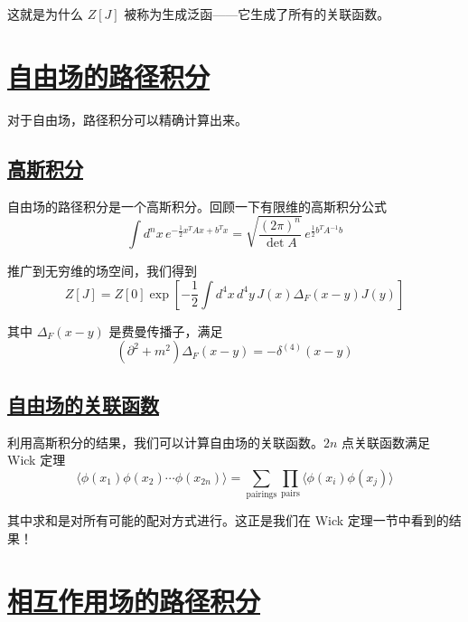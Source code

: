 这就是为什么 $Z[J]$ 被称为生成泛函——它生成了所有的关联函数。

\section{\protect\hyperlink{:}{自由场的路径积分}}

对于自由场，路径积分可以精确计算出来。

\subsection{\protect\hyperlink{:}{高斯积分}}

自由场的路径积分是一个高斯积分。回顾一下有限维的高斯积分公式
\begin{equation}
    \int d^n x \, e^{-\frac{1}{2}x^T A x + b^T x} = \sqrt{\frac{(2\pi)^n}{\det A}} \, e^{\frac{1}{2}b^T A^{-1} b}
\end{equation}

推广到无穷维的场空间，我们得到
\begin{equation}
    Z[J] = Z[0] \exp\left[-\frac{1}{2}\int d^4x \, d^4y \, J(x) \Delta_F(x-y) J(y)\right]
\end{equation}

其中 $\Delta_F(x-y)$ 是费曼传播子，满足
\begin{equation}
    (\partial^2 + m^2)\Delta_F(x-y) = -\delta^{(4)}(x-y)
\end{equation}

\subsection{\protect\hyperlink{:}{自由场的关联函数}}

利用高斯积分的结果，我们可以计算自由场的关联函数。$2n$ 点关联函数满足 Wick 定理
\begin{equation}
    \langle\phi(x_1)\phi(x_2)\cdots\phi(x_{2n})\rangle = \sum_{\text{pairings}} \prod_{\text{pairs}} \langle\phi(x_i)\phi(x_j)\rangle
\end{equation}

其中求和是对所有可能的配对方式进行。这正是我们在 Wick 定理一节中看到的结果！

\section{\protect\hyperlink{:}{相互作用场的路径积分}}

